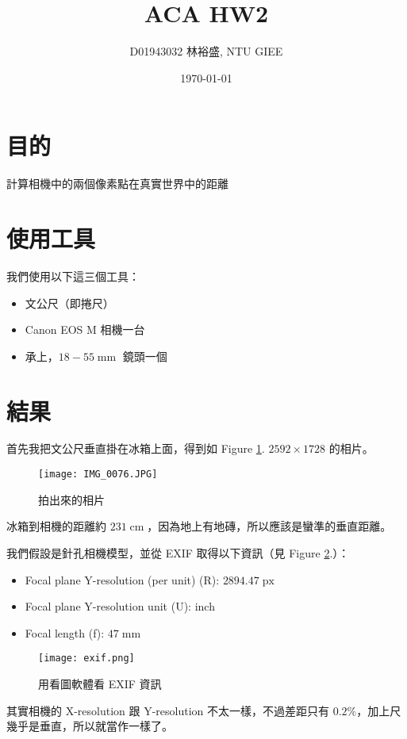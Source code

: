 \documentclass{article}
\newcommand{\figref}[1]{Figure \ref{Fig:#1}.}
\newcommand{\mm}{\operatorname{mm}}
\newcommand{\cm}{\operatorname{cm}}
\newcommand{\px}{\operatorname{px}}
\begin{document}
\title{ACA HW2}
\author{D01943032 林裕盛, NTU GIEE}
\date{\today}
\maketitle

\section{目的}

計算相機中的兩個像素點在真實世界中的距離

\section{使用工具}

我們使用以下這三個工具：
\begin{itemize}
\item 文公尺（即捲尺）
\item Canon EOS M 相機一台
\item 承上，$18-55 \mm$ 鏡頭一個
\end{itemize}

\section{結果}
首先我把文公尺垂直掛在冰箱上面，得到如 \figref{photo} $2592\times 1728$ 的相片。
\begin{figure}[ht]
\centering
\texttt{[image: IMG\_0076.JPG]}
\caption{拍出來的相片}\label{Fig:photo}
\end{figure}
冰箱到相機的距離約 $231 \cm$，因為地上有地磚，所以應該是蠻準的垂直距離。

我們假設是針孔相機模型，並從 EXIF 取得以下資訊（見 \figref{exif}）：
\begin{itemize}
\item Focal plane Y-resolution (per unit) (R): $2894.47 \px$
\item Focal plane Y-resolution unit (U): inch
\item Focal length (f): $47 \mm$
\end{itemize}

\begin{figure}[ht]
\centering
\texttt{[image: exif.png]}
\caption{用看圖軟體看 EXIF 資訊}\label{Fig:exif}
\end{figure}
其實相機的 X-resolution 跟 Y-resolution 不太一樣，不過差距只有 $0.2\%$，加上尺幾乎是垂直，所以就當作一樣了。
\end{document}
